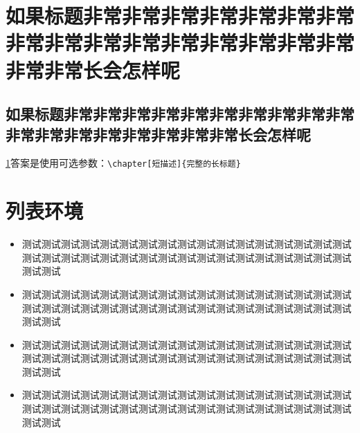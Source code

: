 \documentclass[degree=mg]{njuthesis}
\begin{document}
\maketitle




\raggedbottom

\tableofcontents
\listoffigures
\listoftables

\mainmatter

\chapter[非常长的标题不好看]{如果标题非常非常非常非常非常非常非常非常非常非常非常非常非常非常非常非常非常非常长会怎样呢}
\label{ch:longtitle}
\section[还是用短点的吧]{如果标题非常非常非常非常非常非常非常非常非常非常非常非常非常非常非常非常非常非常长会怎样呢}
\cref{ch:longtitle}答案是使用可选参数：\verb+\chapter[短描述]{完整的长标题}+

\zhlipsum[1-20][name=zhufu]

\chapter{列表环境}

\begin{itemize}
    \item 测试测试测试测试测试测试测试测试测试测试测试测试测试测试测试测试测试测试测试测试测试测试测试测试测试测试测试测试测试测试测试测试测试测试测试测试
    \item 测试测试测试测试测试测试测试测试测试测试测试测试测试测试测试测试测试测试测试测试测试测试测试测试测试测试测试测试测试测试测试测试测试测试测试测试
    \item 测试测试测试测试测试测试测试测试测试测试测试测试测试测试测试测试测试测试测试测试测试测试测试测试测试测试测试测试测试测试测试测试测试测试测试测试
    \item 测试测试测试测试测试测试测试测试测试测试测试测试测试测试测试测试测试测试测试测试测试测试测试测试测试测试测试测试测试测试测试测试测试测试测试测试
\end{itemize}
\end{document}

